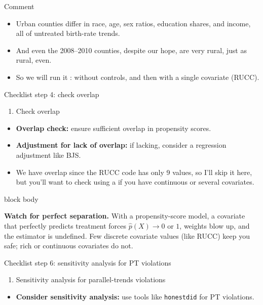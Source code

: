 \documentclass[aspectratio=169,11pt]{beamer}
\newcommand{\emphbox}[1]{%
  \begin{beamercolorbox}[rounded=true,sep=7pt,wd=\linewidth]{block body}%
    \small\color{slate}\raggedright #1%
  \end{beamercolorbox}}
\begin{document}
\begin{frame}{Comment}
\vspace{0.5em}
\begin{itemize}\setlength\itemsep{0.6em}
  \item Urban counties differ in race, age, sex ratios, education shares, and income, all  of untreated birth-rate trends.
  \item And even the 2008--2010 counties, despite our hope, are very rural, just as rural, even.
  \item So we will run it : without controls, and then with a single covariate (RUCC).
\end{itemize}
\end{frame}

\begin{frame}{Checklist step 4: check overlap}
\vspace{0.6em}
\begin{enumerate}
\item[4.] Check overlap
\end{enumerate}
\vspace{0.4em}
\begin{itemize}\small\setlength\itemsep{0.45em}
  \item \textbf{Overlap check:} ensure sufficient overlap in propensity scores.
  \item \textbf{Adjustment for lack of overlap:} if lacking, consider a regression adjustment like BJS.
  \item We have overlap since the RUCC code has only 9 values, so I'll skip it here, but you'll want to check using a  if you have continuous or several covariates.
\end{itemize}
\vspace{0.4em}
\emphbox{\textbf{Watch for perfect separation.} With a propensity-score model, a covariate that perfectly predicts treatment forces $\hat p(X) \to 0$ or $1$, weights blow up, and the estimator is undefined. Few discrete covariate values (like RUCC) keep you safe; rich or continuous covariates do not.}
\end{frame}

\begin{frame}{Checklist step 6: sensitivity analysis for PT violations}
\vspace{0.6em}
\begin{enumerate}
\item[6.] Sensitivity analysis for parallel-trends violations
\end{enumerate}
\vspace{0.4em}
\begin{itemize}
  \item \textbf{Consider sensitivity analysis:} use tools like \texttt{honestdid} for PT violations.
\end{itemize}
\end{frame}
\end{document}
